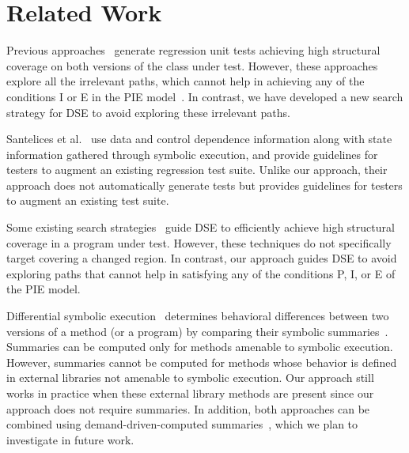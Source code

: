 
\section{Related Work}
\label{sec:related}
Previous approaches~\cite{evans:DiffTest07,taneja08:diffgen,jin10:automated} generate regression unit tests achieving high structural coverage on both versions of the class under test. However, these approaches explore all the irrelevant paths, which cannot help in achieving any of the conditions I or E in the PIE model~\cite{voas}. In contrast, we have developed a new search strategy for DSE to avoid exploring these irrelevant paths. 

Santelices et al.~\cite{Apiwattanapong2006AUG,santelices08sep} use data and control dependence information along with state information gathered through symbolic execution, and provide guidelines for testers to augment an existing regression test suite. Unlike our approach, their approach does not automatically generate tests but provides guidelines for testers to augment an existing test suite. 

Some existing search strategies~\cite{burnim,fitnex} guide DSE to efficiently achieve high structural coverage in a program under test. However,
these techniques do not specifically target covering a changed region. In contrast, our approach guides DSE to avoid exploring paths that cannot help in satisfying any of the conditions P, I, or E of the PIE model.

Differential symbolic execution~\cite{DSE} determines behavioral differences between two versions of a method (or a program) by comparing their symbolic summaries~\cite{CSE}. Summaries can be computed only for methods amenable to symbolic execution. However, summaries cannot be computed for methods whose behavior is defined in external libraries not amenable to symbolic execution. Our approach still works in practice when these external library methods are present since our approach does not require summaries. In addition, both approaches can be combined using demand-driven-computed summaries~\cite{demandDriven}, which we plan to investigate in future work.



